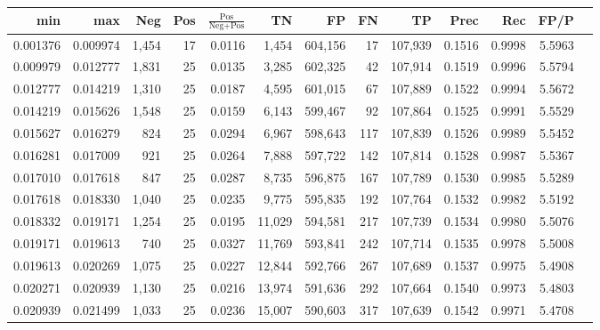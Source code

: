 \begin{tabular}{rrrrrrrrrrrrr}
\toprule
     min &      max &   Neg & Pos & $\frac{\text{Pos}}{\text{Neg}+\text{Pos}}$ &      TN &      FP &      FN &      TP &   Prec &    Rec &   FP/P \\
\midrule
0.001376 & 0.009974 & 1,454 &  17 &                                     0.0116 &   1,454 & 604,156 &      17 & 107,939 & 0.1516 & 0.9998 & 5.5963 \\
0.009979 & 0.012777 & 1,831 &  25 &                                     0.0135 &   3,285 & 602,325 &      42 & 107,914 & 0.1519 & 0.9996 & 5.5794 \\
0.012777 & 0.014219 & 1,310 &  25 &                                     0.0187 &   4,595 & 601,015 &      67 & 107,889 & 0.1522 & 0.9994 & 5.5672 \\
0.014219 & 0.015626 & 1,548 &  25 &                                     0.0159 &   6,143 & 599,467 &      92 & 107,864 & 0.1525 & 0.9991 & 5.5529 \\
0.015627 & 0.016279 &   824 &  25 &                                     0.0294 &   6,967 & 598,643 &     117 & 107,839 & 0.1526 & 0.9989 & 5.5452 \\
0.016281 & 0.017009 &   921 &  25 &                                     0.0264 &   7,888 & 597,722 &     142 & 107,814 & 0.1528 & 0.9987 & 5.5367 \\
0.017010 & 0.017618 &   847 &  25 &                                     0.0287 &   8,735 & 596,875 &     167 & 107,789 & 0.1530 & 0.9985 & 5.5289 \\
0.017618 & 0.018330 & 1,040 &  25 &                                     0.0235 &   9,775 & 595,835 &     192 & 107,764 & 0.1532 & 0.9982 & 5.5192 \\
0.018332 & 0.019171 & 1,254 &  25 &                                     0.0195 &  11,029 & 594,581 &     217 & 107,739 & 0.1534 & 0.9980 & 5.5076 \\
0.019171 & 0.019613 &   740 &  25 &                                     0.0327 &  11,769 & 593,841 &     242 & 107,714 & 0.1535 & 0.9978 & 5.5008 \\
0.019613 & 0.020269 & 1,075 &  25 &                                     0.0227 &  12,844 & 592,766 &     267 & 107,689 & 0.1537 & 0.9975 & 5.4908 \\
0.020271 & 0.020939 & 1,130 &  25 &                                     0.0216 &  13,974 & 591,636 &     292 & 107,664 & 0.1540 & 0.9973 & 5.4803 \\
0.020939 & 0.021499 & 1,033 &  25 &                                     0.0236 &  15,007 & 590,603 &     317 & 107,639 & 0.1542 & 0.9971 & 5.4708 \\

\end{tabular}
